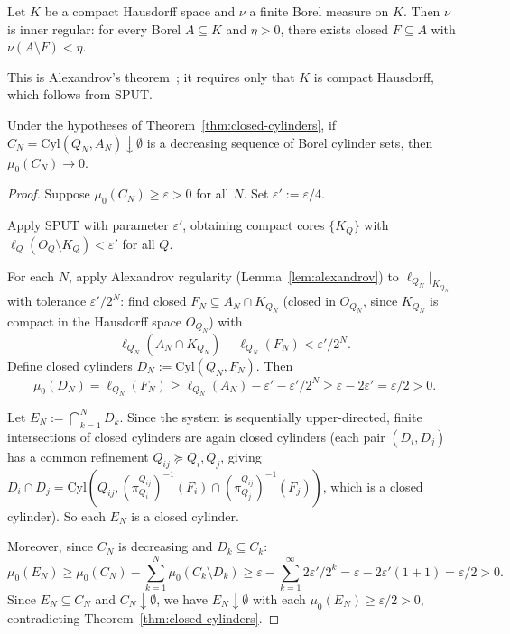 \begin{lemma}
\label{lem:alexandrov}
Let $K$ be a compact Hausdorff space and $\nu$ a finite Borel measure
on $K$.  Then $\nu$ is inner regular: for every Borel $A \subseteq K$
and $\eta > 0$, there exists closed $F \subseteq A$ with
$\nu(A \setminus F) < \eta$.
\end{lemma}

This is Alexandrov's theorem~\cite{Alexandrov1943,Bogachev2007}; it requires only that $K$ is compact
Hausdorff, which follows from SPUT.

\begin{theorem}
\label{thm:borel-cylinders}
Under the hypotheses of Theorem~\ref{thm:closed-cylinders}, if
$C_N = \mathrm{Cyl}(Q_N, A_N) \downarrow \emptyset$ is a decreasing
sequence of Borel cylinder sets, then $\mu_0(C_N) \to 0$.
\end{theorem}

\begin{proof}
Suppose $\mu_0(C_N) \geq \varepsilon > 0$ for all $N$.
Set $\varepsilon' := \varepsilon/4$.

Apply SPUT with parameter $\varepsilon'$, obtaining compact cores
$\{K_Q\}$ with $\ell_Q(O_Q \setminus K_Q) < \varepsilon'$ for all
$Q$.

For each $N$, apply Alexandrov regularity (Lemma~\ref{lem:alexandrov})
to $\ell_{Q_N}|_{K_{Q_N}}$ with tolerance $\varepsilon'/2^N$: find
closed $F_N \subseteq A_N \cap K_{Q_N}$ (closed in $O_{Q_N}$, since
$K_{Q_N}$ is compact in the Hausdorff space $O_{Q_N}$) with
\[
\ell_{Q_N}(A_N \cap K_{Q_N}) - \ell_{Q_N}(F_N) < \varepsilon'/2^N.
\]
Define closed cylinders $D_N := \mathrm{Cyl}(Q_N, F_N)$.  Then
\[
\mu_0(D_N)
= \ell_{Q_N}(F_N)
\geq \ell_{Q_N}(A_N) - \varepsilon' - \varepsilon'/2^N
\geq \varepsilon - 2\varepsilon'
= \varepsilon/2 > 0.
\]

Let $E_N := \bigcap_{k=1}^N D_k$.  Since the system is sequentially
upper-directed, finite intersections of closed cylinders are again
closed cylinders (each pair $(D_i, D_j)$ has a common refinement
$Q_{ij} \succeq Q_i, Q_j$, giving
$D_i \cap D_j = \mathrm{Cyl}(Q_{ij},
(\pi^{Q_{ij}}_{Q_i})^{-1}(F_i) \cap (\pi^{Q_{ij}}_{Q_j})^{-1}(F_j))$,
which is a closed cylinder).  So each $E_N$ is a closed cylinder.

Moreover, since $C_N$ is decreasing and $D_k \subseteq C_k$:
\[
\mu_0(E_N)
\geq \mu_0(C_N) - \sum_{k=1}^N \mu_0(C_k \setminus D_k)
\geq \varepsilon - \sum_{k=1}^\infty 2\varepsilon'/2^k
= \varepsilon - 2\varepsilon'(1 + 1)
= \varepsilon/2 > 0.
\]
Since $E_N \subseteq C_N$ and $C_N \downarrow \emptyset$, we have
$E_N \downarrow \emptyset$ with each $\mu_0(E_N) \geq \varepsilon/2
> 0$, contradicting Theorem~\ref{thm:closed-cylinders}.
\end{proof}

